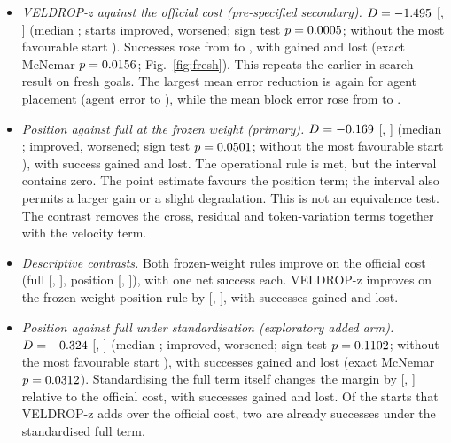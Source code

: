 \begin{itemize}[leftmargin=*,itemsep=1pt]
\item \emph{VELDROP-z against the official cost (pre-specified secondary).} $D=-1.495$ [\RTwQTwoLo, \RTwQTwoHi]
  (median \RTwQTwoMed; \RTwQTwoImp{} starts improved, \RTwQTwoWor{} worsened; sign test $p=0.0005$; without the most
  favourable start \RTwQTwoLBO). Successes rose from \RTwRawSucc{} to \RTwVZSucc, with \RTwQTwoGain{} gained and
  \RTwQTwoLoss{} lost (exact McNemar $p=0.0156$; Fig.~\ref{fig:fresh}). This repeats the earlier in-search
  result on fresh goals. The largest mean error reduction is
  again for agent placement (agent error \RTwRawAgent{} to \RTwVZAgent), while the mean block error rose from
  \RTwRawBlock{} to \RTwVZBlock.
\item \emph{Position against full at the frozen weight (primary).} $D=-0.169$ [\RTwQOneLo,
  \RTwQOneHi] (median \RTwQOneMed; \RTwQOneImp{} improved, \RTwQOneWor{} worsened; sign test $p=0.0501$; without the
  most favourable start \RTwQOneLBO), with \RTwQOneGain{} success gained and \RTwQOneLoss{} lost. The operational rule is
  met, but the interval contains zero. The point estimate favours the position term; the interval also permits a
  larger gain or a slight degradation. This is not an equivalence test. The contrast removes the cross, residual and token-variation terms together with the velocity term.
\item \emph{Descriptive contrasts.} Both frozen-weight rules improve on the official cost (full \RTwFFRawD{}
  [\RTwFFRawLo, \RTwFFRawHi], position \RTwFPRawD{} [\RTwFPRawLo, \RTwFPRawHi]), with one net success each. VELDROP-z
  improves on the frozen-weight position rule by \RTwVZFPD{} [\RTwVZFPLo, \RTwVZFPHi], with \RTwVZFPGain{} successes
  gained and \RTwVZFPLoss{} lost.
\item \emph{Position against full under standardisation (exploratory added arm).} $D=-0.324$ [\RThLo, \RThHi] (median
  \RThMed; \RThImp{} improved, \RThWor{} worsened; sign test $p=0.1102$; without the most favourable start \RThLBO), with
  \RThGain{} successes gained and \RThLoss{} lost (exact McNemar $p=0.0312$). Standardising the full term itself changes the
  margin by \RThStdRawD{} [\RThStdRawLo, \RThStdRawHi] relative to the official cost, with \RThStdRawGain{} successes
  gained and \RThStdRawLoss{} lost. Of the \RTwQTwoGain{} starts that VELDROP-z adds over the official cost, two are
  already successes under the standardised full term.
\end{itemize}
